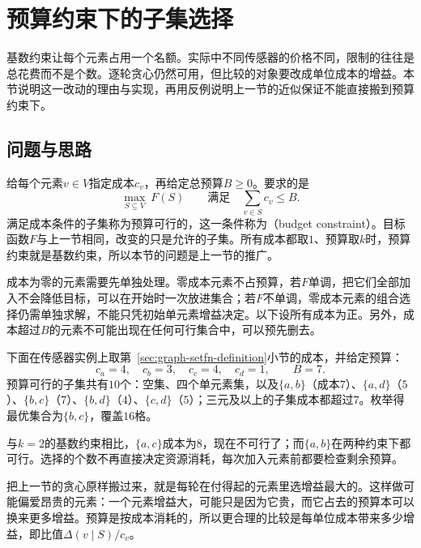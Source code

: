 
\section{预算约束下的子集选择}
\label{sec:graph-budget-selection}

基数约束让每个元素占用一个名额。实际中不同传感器的价格不同，限制的往往是总花费而不是个数。逐轮贪心仍然可用，但比较的对象要改成单位成本的增益。本节说明这一改动的理由与实现，再用反例说明上一节的近似保证不能直接搬到预算约束下。

\subsection{问题与思路}
\label{sec:graph-setfn-budget-problem}

给每个元素$v\in V$指定成本$c_v$，再给定总预算$B\geq0$。要求的是
\begin{equation}
  \max_{S\subseteq V}\ F(S)\qquad\text{满足}\quad\sum_{v\in S}c_v\leq B.
  \label{eq:graph-setfn-budget-problem}
\end{equation}
满足成本条件的子集称为预算可行的，这一条件称为（budget constraint）。目标函数$F$与上一节相同，改变的只是允许的子集。所有成本都取$1$、预算取$k$时，预算约束就是基数约束，所以本节的问题是上一节的推广。

成本为零的元素需要先单独处理。零成本元素不占预算，若$F$单调，把它们全部加入不会降低目标，可以在开始时一次放进集合；若$F$不单调，零成本元素的组合选择仍需单独求解，不能只凭初始单元素增益决定。以下设所有成本为正。另外，成本超过$B$的元素不可能出现在任何可行集合中，可以预先删去。

下面在传感器实例上取第~\ref{sec:graph-setfn-definition}小节的成本，并给定预算：
\[
  c_a=4,\quad c_b=3,\quad c_c=4,\quad c_d=1,\qquad B=7.
\]
预算可行的子集共有$10$个：空集、四个单元素集，以及$\{a,b\}$（成本$7$）、$\{a,d\}$（$5$）、$\{b,c\}$（$7$）、$\{b,d\}$（$4$）、$\{c,d\}$（$5$）；三元及以上的子集成本都超过$7$。枚举得最优集合为$\{b,c\}$，覆盖$16$格。

与$k=2$的基数约束相比，$\{a,c\}$成本为$8$，现在不可行了；而$\{a,b\}$在两种约束下都可行。选择的个数不再直接决定资源消耗，每次加入元素前都要检查剩余预算。

把上一节的贪心原样搬过来，就是每轮在付得起的元素里选增益最大的。这样做可能偏爱昂贵的元素：一个元素增益大，可能只是因为它贵，而它占去的预算本可以换来更多增益。预算是按成本消耗的，所以更合理的比较是每单位成本带来多少增益，即比值$\Delta(v\mid S)/c_v$。

